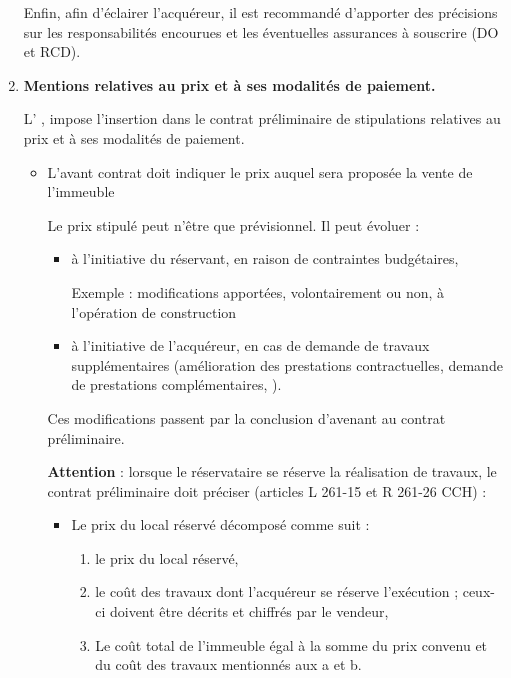 \begin{enumerate}
						Enfin, afin d’éclairer l’acquéreur, il est recommandé d’apporter des précisions sur les responsabilités encourues et les éventuelles assurances à souscrire (DO et RCD).


						\item \textbf{Mentions relatives au prix et à ses modalités de paiement.}

						L’ , impose l’insertion dans le contrat préliminaire de stipulations relatives au prix et à ses modalités de paiement.


						\begin{itemize}
							\item L’avant contrat doit indiquer le prix auquel sera proposée la vente de l'immeuble

								\medskip Le prix stipulé peut n’être que prévisionnel.
								Il peut évoluer :
								\begin{itemize}
									\item à l’initiative du réservant, en raison de contraintes budgétaires,

									Exemple : modifications apportées, volontairement ou non, à l'opération de construction

									\item à l’initiative de l’acquéreur, en cas de demande de travaux supplémentaires (amélioration des prestations contractuelles, demande de prestations complémentaires, \etc).
								\end{itemize}

								Ces modifications passent par la conclusion d’avenant au contrat préliminaire.

								\medskip \textbf{Attention} : lorsque le réservataire se réserve la réalisation de travaux, le contrat préliminaire doit préciser (articles L 261-15 et R 261-26 CCH) :
								\begin{itemize}
									\item Le prix du local réservé décomposé comme suit :
									\begin{enumerate}[label=\alph*)]
										\item le prix du local réservé,
										\item le coût des travaux dont l'acquéreur se réserve l'exécution ; ceux-ci doivent être décrits et chiffrés par le vendeur,
										\item Le coût total de l'immeuble égal à la somme du prix convenu et du coût des travaux mentionnés aux a et b.
									\end{enumerate}


\end{itemize}
\end{itemize}
\end{enumerate}
